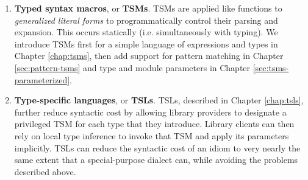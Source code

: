 \begin{enumerate}
\item \textbf{Typed syntax macros}, or \textbf{TSMs}. TSMs are applied like functions to \emph{generalized literal forms} to programmatically control their  parsing and expansion. This occurs statically (i.e. simultaneously with typing). We  introduce TSMs first for a simple language of expressions and types in Chapter \ref{chap:tsms}, then add support for pattern matching  in Chapter \ref{sec:pattern-tsms} and type and module parameters in Chapter \ref{sec:tsms-parameterized}.
\item \textbf{Type-specific languages}, or \textbf{TSLs}. TSLs, described in Chapter \ref{chap:tsls}, further reduce syntactic cost by allowing library providers to designate a privileged TSM for each type that they introduce. Library clients can then rely on local type inference to invoke that TSM and apply its parameters implicitly. TSLs can reduce the syntactic cost of an idiom to very nearly the same extent that a special-purpose dialect can, while avoiding the problems described above.
\end{enumerate} 

